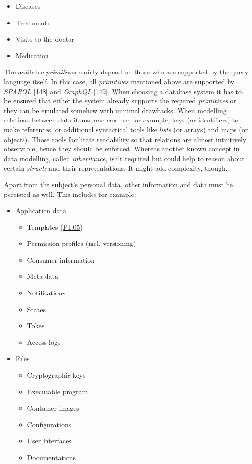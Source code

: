 \documentclass[12pt,english,a4paper,titlepage,cleardoublepage=empty,dottedtoc]{report}
\providecommand{\tightlist}{%
  \setlength{\itemsep}{0pt}\setlength{\parskip}{0pt}}
\begin{document}
\begin{itemize}
  \begin{itemize}
  \tightlist
  \item
    Diseases
  \item
    Treatments
  \item
    Visits to the doctor
  \item
    Medication
  \end{itemize}
\end{itemize}

The available \emph{primitives} mainly depend on those who are supported
by the query language itself. In this case, all \emph{primitives}
mentioned above are supported by \emph{SPARQL}
{[}\protect\hyperlink{ref-web_spec_xml_types}{148}{]} and \emph{GraphQL}
{[}\protect\hyperlink{ref-web_spec_graphql_types}{149}{]}. When choosing
a database system it has to be ensured that either the system already
supports the required \emph{primitives} or they can be emulated somehow
with minimal drawbacks. When modelling relations between data items, one
can use, for example, keys (or identifiers) to make references, or
additional syntactical tools like \emph{lists} (or arrays) and maps (or
objects). Those tools facilitate readability so that relations are
almost intuitively observable, hence they should be enforced. Whereas
another known concept in data modelling, called \emph{inheritance},
isn't required but could help to reason about certain \emph{structs} and
their representations. It might add complexity, though.

Apart from the subject's personal data, other information and data must
be persisted as well. This includes for example:

\begin{itemize}
\tightlist
\item
  Application data

  \begin{itemize}
  \tightlist
  \item
    Templates (\protect\hyperlink{pi05}{P.I.05})
  \item
    Permission profiles (incl. versioning)
  \item
    Consumer information
  \item
    Meta data
  \item
    Notifications
  \item
    States
  \item
    Tokes
  \item
    Access logs
  \end{itemize}
\item
  Files

  \begin{itemize}
  \tightlist
  \item
    Cryptographic keys
  \item
    Executable program
  \item
    Container images
  \item
    Configurations
  \item
    User interfaces
  \item
    Documentations
  \end{itemize}
\end{itemize}
\end{document}
